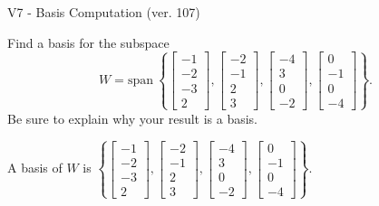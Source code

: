 \begin{exercise}
  \begin{exerciseTitle}V7 - Basis Computation (ver. 107)\end{exerciseTitle}
  \begin{exerciseStatement}
    Find a basis for the subspace 
\[W=\mathrm{span}\ \left\{\left[\begin{array}{r}
-1 \\
-2 \\
-3 \\
2
\end{array}\right] , \left[\begin{array}{r}
-2 \\
-1 \\
2 \\
3
\end{array}\right] , \left[\begin{array}{r}
-4 \\
3 \\
0 \\
-2
\end{array}\right] , \left[\begin{array}{r}
0 \\
-1 \\
0 \\
-4
\end{array}\right]\right\}.\]
 Be sure to explain why your result is a basis.


  \end{exerciseStatement}
  \begin{exerciseAnswer}
   A basis of \(W\) is  \(\left\{\left[\begin{array}{r}
-1 \\
-2 \\
-3 \\
2
\end{array}\right] , \left[\begin{array}{r}
-2 \\
-1 \\
2 \\
3
\end{array}\right] , \left[\begin{array}{r}
-4 \\
3 \\
0 \\
-2
\end{array}\right] , \left[\begin{array}{r}
0 \\
-1 \\
0 \\
-4
\end{array}\right]\right\}\).
  


  \end{exerciseAnswer}
\end{exercise}